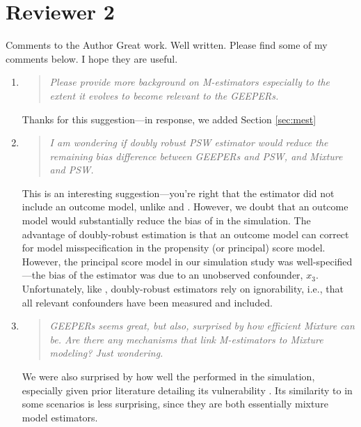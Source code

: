 \documentclass[]{article}
\newenvironment{itquote}
  {\begin{quote} \itshape}
  {\end{quote}\ignorespacesafterend}
\begin{document}
\section*{Reviewer 2}
Comments to the Author
Great work. Well written. Please find some of my comments below. I hope they are useful.

\begin{enumerate}

\item \begin{itquote}   Please provide more background on M-estimators especially to the extent it evolves to become relevant to the GEEPERs. 
\end{itquote}
Thanks for this suggestion---in response, we added Section \ref{sec:mest}
\item \begin{itquote}      I am wondering if doubly robust PSW estimator would reduce the remaining bias difference between GEEPERs and PSW, and Mixture and PSW.
\end{itquote}
This is an interesting suggestion---you're right that the \psw estimator did not include an outcome model, unlike \geepers and \nmm. However, we doubt that an outcome model would substantially reduce the bias of \psw in the simulation. The advantage of doubly-robust estimation is that an outcome model can correct for model misspecification in the propensity (or principal) score model. However, the principal score model in our simulation study was well-specified---the bias of the \psw estimator was due to an unobserved confounder, $x_3$. Unfortunately, like \psw, doubly-robust estimators rely on ignorability, i.e., that all relevant confounders have been measured and included. 
\item \begin{itquote}      GEEPERs seems great, but also, surprised by how efficient Mixture can be. Are there any mechanisms that link M-estimators to Mixture modeling? Just wondering.
\end{itquote}
We were also surprised by how well the \nmm performed in the simulation, especially given prior literature detailing its vulnerability \citep[][; cited in the paper]{griffin2008application,feller2016principal}. Its similarity to \geepers in some scenarios is less surprising, since they are both essentially mixture model estimators.


\end{enumerate}
\end{document}
